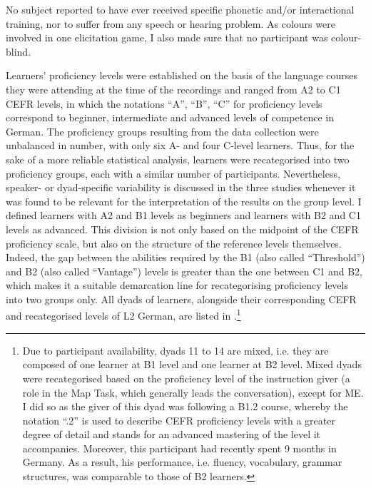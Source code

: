 No subject reported to have ever received specific phonetic and/or interactional training, nor to suffer from any speech or hearing problem. As colours were involved in one elicitation game, I also made sure that no participant was colour-blind.

Learners’ proficiency levels were established on the basis of the language courses they were attending at the time of the recordings and ranged from A2 to C1 CEFR levels, in which the notations “A”, “B”, “C” for proficiency levels correspond to beginner, intermediate and advanced levels of competence in German. The proficiency groups resulting from the data collection were unbalanced in number, with only six A- and four C-level learners. Thus, for the sake of a more reliable statistical analysis, learners were recategorised into two proficiency groups, each with a similar number of participants. Nevertheless, speaker- or dyad-specific variability is discussed in the three studies whenever it was found to be relevant for the interpretation of the results on the group level. I defined learners with A2 and B1 levels as beginners and learners with B2 and C1 levels as advanced. This division is not only based on the midpoint of the CEFR proficiency scale, but also on the structure of the reference levels themselves. Indeed, the gap between the abilities required by the B1 (also called “Threshold”) and B2 (also called “Vantage”) levels is greater than the one between C1 and B2, which makes it a suitable demarcation line for recategorising proficiency levels into two groups only. All dyads of learners, alongside their corresponding CEFR and recategorised levels of L2 German, are listed in .\footnote{Due to participant availability, dyads 11 to 14 are mixed, i.e. they are composed of one learner at B1 level and one learner at B2 level. Mixed dyads were recategorised based on the proficiency level of the instruction giver (a role in the Map Task, which generally leads the conversation), except for ME. I did so as the giver of this dyad was following a B1.2 course, whereby the notation “.2” is used to describe CEFR proficiency levels with a greater degree of detail and stands for an advanced mastering of the level it accompanies. Moreover, this participant had recently spent 9 months in Germany. As a result, his performance, i.e. fluency, vocabulary, grammar structures, was comparable to those of B2 learners.}

